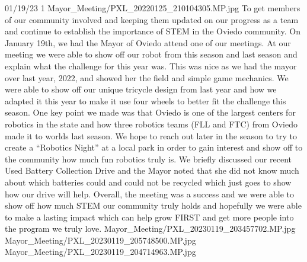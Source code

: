 {01/19/23}
{1}
{Mayor_Meeting/PXL_20220125_210104305.MP.jpg}
{To get members of our community involved and keeping them updated on our progress as a team and continue to establish the importance of STEM in the Oviedo community.}
{On January 19th, we had the Mayor of Oviedo attend one of our meetings. At our meeting we were able to show off our robot from this season and last season and explain what the challenge for this year was. This was nice as we had the mayor over last year, 2022, and showed her the field and simple game mechanics. We were able to show off our unique tricycle design from last year and how we adapted it this year to make it use four wheels to better fit the challenge this season. One key point we made was that Oviedo is one of the largest centers for robotics in the state and how three robotics teams (FLL and FTC) from Oviedo made it to worlds last season. We hope to reach out later in the season to try to create a “Robotics Night” at a local park in order to gain interest and show off to the community how much fun robotics truly is. We briefly discussed our recent Used Battery Collection Drive and the Mayor noted that she did not know much about which batteries could and could not be recycled which just goes to show how our drive will help. Overall, the meeting was a success and we were able to show off how much STEM our community truly holds and hopefully we were able to make a lasting impact which can help grow FIRST and get more people into the program we truly love.
} 
{Mayor_Meeting/PXL_20230119_203457702.MP.jpg}
{Mayor_Meeting/PXL_20230119_205748500.MP.jpg}
{Mayor_Meeting/PXL_20230119_204714963.MP.jpg}
